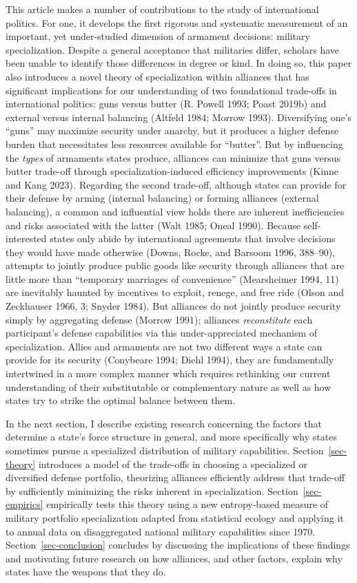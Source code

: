 \documentclass[
  12,
  letterpaper,
  DIV=11,
  numbers=noendperiod]{scrartcl}
\begin{document}
This article makes a number of contributions to the study of
international politics. For one, it develops the first rigorous and
systematic measurement of an important, yet under-studied dimension of
armament decisions: military specialization. Despite a general
acceptance that militaries differ, scholars have been unable to identify
those differences in degree or kind. In doing so, this paper also
introduces a novel theory of specialization within alliances that has
significant implications for our understanding of two foundational
trade-offs in international politics: guns versus butter (R. Powell
1993; Poast 2019b) and external versus internal balancing (Altfeld 1984;
Morrow 1993). Diversifying one's ``guns'' may maximize security under
anarchy, but it produces a higher defense burden that necessitates less
resources available for ``butter''. But by influencing the \emph{types}
of armaments states produce, alliances can minimize that guns versus
butter trade-off through specialization-induced efficiency improvements
(Kinne and Kang 2023)\emph{.} Regarding the second trade-off, although
states can provide for their defense by arming (internal balancing) or
forming alliances (external balancing), a common and influential view
holds there are inherent inefficiencies and risks associated with the
latter (Walt 1985; Oneal 1990). Because self-interested states only
abide by international agreements that involve decisions they would have
made otherwise (Downs, Rocke, and Barsoom 1996, 388--90), attempts to
jointly produce public goods like security through alliances that are
little more than ``temporary marriages of convenience'' (Mearsheimer
1994, 11) are inevitably haunted by incentives to exploit, renege, and
free ride (Olson and Zeckhauser 1966, 3; Snyder 1984). But alliances do
not jointly produce security simply by aggregating defense (Morrow
1991); alliances \emph{reconstitute} each participant's defense
capabilities via this under-appreciated mechanism of specialization.
Allies and armaments are not two different ways a state can provide for
its security (Conybeare 1994; Diehl 1994), they are fundamentally
intertwined in a more complex manner which requires rethinking our
current understanding of their substitutable or complementary nature as
well as how states try to strike the optimal balance between them.

In the next section, I describe existing research concerning the factors
that determine a state's force structure in general, and more
specifically why states sometimes pursue a specialized distribution of
military capabilities. Section~\ref{sec-theory} introduces a model of
the trade-offs in choosing a specialized or diversified defense
portfolio, theorizing alliances efficiently address that trade-off by
sufficiently minimizing the risks inherent in specialization.
Section~\ref{sec-empirics} empirically tests this theory using a new
entropy-based measure of military portfolio specialization adapted from
statistical ecology and applying it to annual data on disaggregated
national military capabilities since 1970. Section~\ref{sec-conclusion}
concludes by discussing the implications of these findings and
motivating future research on how alliances, and other factors, explain
why states have the weapons that they do.
\end{document}
